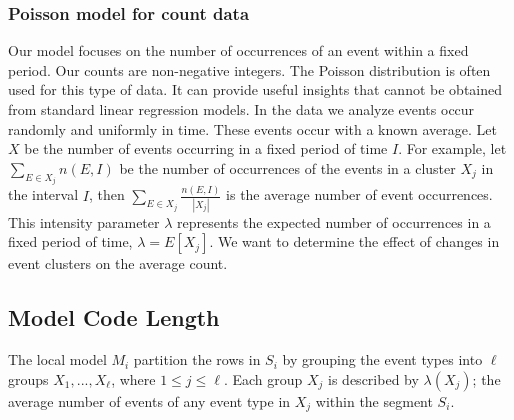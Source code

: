 

\subsubsection{Poisson model for count data}
Our model focuses on the number of occurrences of an event within a fixed period. Our counts are non-negative integers. The Poisson distribution is often used for this type of data. It can provide useful insights that cannot be obtained from standard linear regression models. In the data we analyze events occur randomly and uniformly in time. These events occur with a known average. Let $X$ be the number of events occurring in a fixed period of time $I$. For example, let $\sum\limits_{E \in X_j}{n(E,I)}$ be the number of occurrences of the events in a cluster $X_j$ in the interval $I$, then $\sum\limits_{E \in X_j}\frac{n(E,I)}{|X_j|}$  is the average number of event occurrences. This intensity parameter $\lambda$ represents the expected number of occurrences in a fixed period of time, $\lambda=E[X_j]$. We want to determine the effect of changes in event clusters on the average count. 

\subsection{Model Code Length}
The local model $M_i$ partition the rows in $S_i$ by grouping the event types into $\ell$ groups $X_1,...,X_\ell$, where $1\leq j \leq \ell$. Each group $X_j$ is described by $\lambda(X_j)$; the average number of events of any event type in $X_j$ within the segment $S_i$. 


